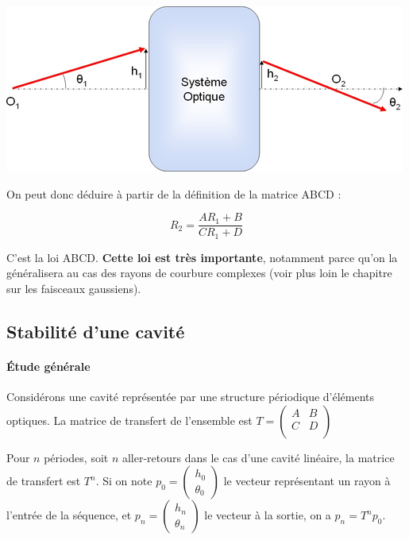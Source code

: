 \documentclass{book}
\begin{document}
{\centering
\includegraphics[scale=1.7]{images/fig06.jpg}
\par}

On peut donc déduire à partir de la définition de la matrice ABCD :

  $$R_2 = \frac{AR_1 + B}{CR_1 + D}$$
  
C'est la loi ABCD. \textbf{\color{red}Cette loi est très importante}, notamment parce qu'on la généralisera au cas des rayons de courbure complexes (voir plus loin le chapitre sur les faisceaux gaussiens). 

\subsection{Stabilité d'une cavité}
\paragraph{Étude générale}
 Considérons une cavité représentée par une structure périodique d'éléments optiques. La matrice de transfert de l'ensemble est $T = \begin{pmatrix}
            A & B \\
            C & D \\
            \end{pmatrix}$ 

Pour $n$ périodes, soit $n$ aller-retours dans le cas d'une cavité linéaire, la matrice de transfert est $T^n$. Si on note $p_0 = \begin{pmatrix}h_0 \\ \theta_0 \end{pmatrix}$ le vecteur représentant un rayon à l'entrée de la séquence, et $p_n = \begin{pmatrix}h_n \\ \theta_n \end{pmatrix}$ le vecteur à la sortie, on a $p_n = T^n p_0$. 
\end{document}
